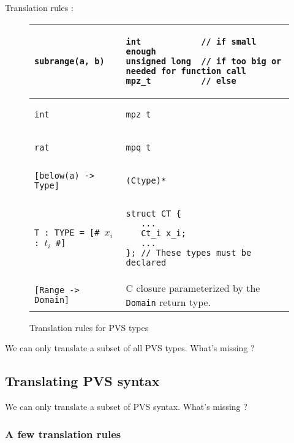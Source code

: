\documentclass[12pt,a4paper]{article}
\newcommand{\cl}[1]{\texttt{#1}}
\begin{document}
Translation rules :

\begin{figure}[!ht]
\begin{tabular}{|l|l|}
\hline
\cl{subrange(a, b)} &
\begin{lstlisting}
int            // if small enough
unsigned long  // if too big or needed for function call
mpz_t          // else
\end{lstlisting} \\ \hline
\cl{int} &
\begin{lstlisting}
mpz_t
\end{lstlisting} \\ \hline
\cl{rat} &
\begin{lstlisting}
mpq_t
\end{lstlisting} \\ \hline
\cl{[below(a) -> Type]} &
\begin{lstlisting}
(Ctype)*
\end{lstlisting} \\ \hline
\cl{T : TYPE = [\# $x_i$ : $t_i$ \#]}  &
\begin{lstlisting}
struct CT {
   ...
   Ct_i x_i;
   ...
}; // These types must be declared
\end{lstlisting} \\ \hline
\cl{[Range -> Domain]} & C closure parameterized by the \cl{Domain} return type.\\ \hline
\end{tabular}
\caption{Translation rules for PVS types}
\end{figure}



We can only translate a subset of all PVS types.
What's missing ?












\subsection{Translating PVS syntax}


We can only translate a subset of PVS syntax.
What's missing ?

\subsubsection{A few translation rules}
\end{document}
